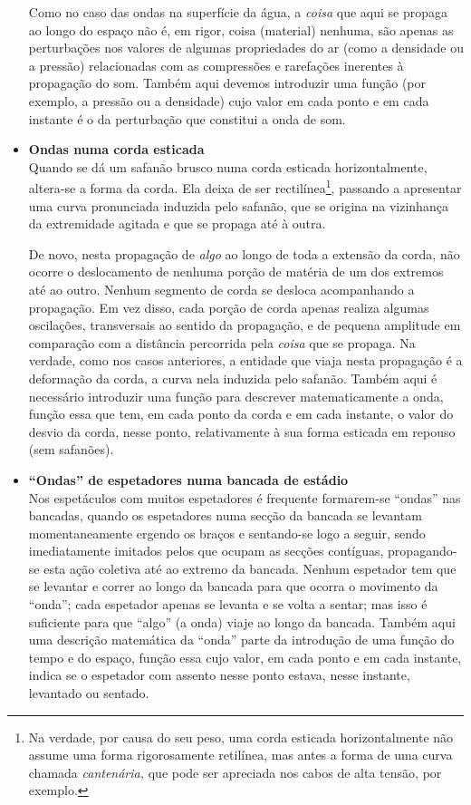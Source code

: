 \begin{itemize}
\begin{figure}[htb]
{        }
    \end{figure}
    Como no caso das ondas na superfície da água, a \emph{coisa} que aqui se
    propaga ao longo do espaço não é, em rigor, coisa (material) nenhuma, são
    apenas as perturbações nos valores de algumas propriedades do ar (como a
    densidade ou a pressão) relacionadas com as compressões e rarefações
    inerentes à propagação do som. Também aqui devemos introduzir uma função
    (por exemplo, a pressão ou a densidade) cujo valor em cada ponto e em cada
    instante é o da perturbação que constitui a onda de som.

\item \textbf{Ondas numa corda esticada}\\
    Quando se dá um safanão brusco numa corda esticada horizontalmente,
    altera-se a forma da corda. Ela deixa de ser rectilínea\footnote{Na verdade,
    por causa do seu peso, uma corda esticada horizontalmente não assume uma
    forma rigorosamente retilínea, mas antes a forma de uma curva chamada
    \emph{cantenária,} que pode ser apreciada nos cabos de alta tensão, por
    exemplo.}, passando a apresentar uma curva pronunciada induzida pelo
    safanão, que se origina na vizinhança da extremidade agitada e que se
    propaga até à outra.

    De novo, nesta propagação de \emph{algo} ao longo de toda a extensão da
    corda, não ocorre o deslocamento de nenhuma porção de matéria de um dos
    extremos até ao outro. Nenhum segmento de corda se desloca acompanhando a
    propagação. Em vez disso, cada porção de corda apenas realiza algumas
    oscilações, transversais ao sentido da propagação, e de pequena amplitude em
    compa\-ração com a distância percorrida pela \emph{coisa} que se propaga. Na
    verdade, como nos casos anteriores, a entidade que viaja nesta propagação é
    a deformação da corda, a curva nela induzida pelo safanão. Também aqui é
    necessário introduzir uma função para descrever matematicamente a onda,
    função essa que tem, em cada ponto da corda e em cada instante, o valor do
    desvio da corda, nesse ponto, relativamente à sua forma esticada em repouso
    (sem safanões).

\item \textbf{``Ondas'' de espetadores numa bancada de estádio}\\
Nos espetáculos com muitos espetadores é frequente formarem-se ``ondas''
nas bancadas, quando os espetadores numa secção da bancada se levantam
momentaneamente ergendo os braços e sentando-se logo a seguir, sendo
imediatamente imitados pelos que ocupam as secções contíguas, propagando-se esta
ação coletiva até ao extremo da bancada. Nenhum espetador tem que se levantar e
correr ao longo da bancada para que ocorra o movimento da ``onda''; cada
espetador apenas se levanta e se volta a sentar; mas isso é suficiente para que
``algo'' (a onda) viaje ao longo da bancada. Também aqui uma descrição
matemática da ``onda'' parte da introdução de uma função do tempo e do espaço,
função essa cujo valor, em cada ponto e em cada instante, indica se o espetador
com assento nesse ponto estava, nesse instante, levantado ou sentado.
\end{itemize}

